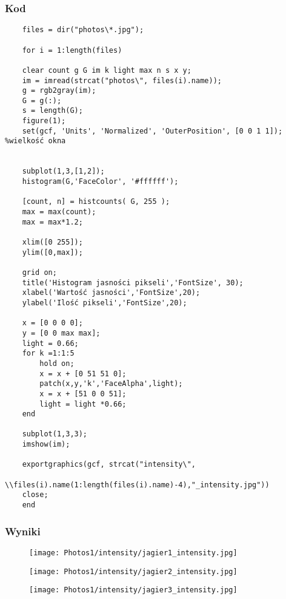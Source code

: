 \documentclass[]{mwart}
\begin{document}
\subsubsection{Kod}
\begin{verbatim}
    files = dir("photos\*.jpg");
    
    for i = 1:length(files)
    
    clear count g G im k light max n s x y;
    im = imread(strcat("photos\", files(i).name));
    g = rgb2gray(im);
    G = g(:);
    s = length(G);
    figure(1);
    set(gcf, 'Units', 'Normalized', 'OuterPosition', [0 0 1 1]); %wielkość okna
    
    
    subplot(1,3,[1,2]); 
    histogram(G,'FaceColor', '#ffffff');
    
    [count, n] = histcounts( G, 255 );
    max = max(count);
    max = max*1.2;
    
    xlim([0 255]);
    ylim([0,max]);
    
    grid on;
    title('Histogram jasności pikseli','FontSize', 30);
    xlabel('Wartość jasności','FontSize',20);
    ylabel('Ilość pikseli','FontSize',20);
    
    x = [0 0 0 0];
    y = [0 0 max max];
    light = 0.66;
    for k =1:1:5
        hold on;
        x = x + [0 51 51 0];
        patch(x,y,'k','FaceAlpha',light);
        x = x + [51 0 0 51];
        light = light *0.66;
    end
    
    subplot(1,3,3);
    imshow(im);
    
    exportgraphics(gcf, strcat("intensity\", 
                        \\files(i).name(1:length(files(i).name)-4),"_intensity.jpg"))
    close;
    end
    \end{verbatim}


\subsubsection{Wyniki}



\begin{figure}[H]
    \centering
    \texttt{[image: Photos1/intensity/jagier1\_intensity.jpg]}
\end{figure}
\begin{figure}[H]
    \centering
    \texttt{[image: Photos1/intensity/jagier2\_intensity.jpg]}
\end{figure}
\begin{figure}[H]
    \centering
    \texttt{[image: Photos1/intensity/jagier3\_intensity.jpg]}
\end{figure}
\end{document}
